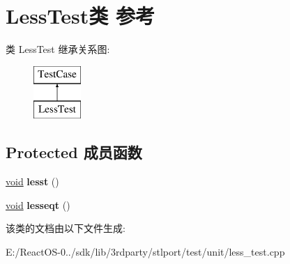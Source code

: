 \hypertarget{class_less_test}{}\section{Less\+Test类 参考}
\label{class_less_test}
类 Less\+Test 继承关系图\+:\begin{figure}[H]
\begin{center}
\leavevmode
\includegraphics[height=2.000000cm]{class_less_test}
\end{center}
\end{figure}
\subsection*{Protected 成员函数}
\begin{DoxyCompactItemize}
\item 
\mbox{\label{class_less_test_a00474b3009b950a2036be2594ff73301}} 
\hyperlink{interfacevoid}{void} {\bfseries lesst} ()
\item 
\mbox{\label{class_less_test_a5c8f87474570351a4429c7b8c67614a7}} 
\hyperlink{interfacevoid}{void} {\bfseries lesseqt} ()
\end{DoxyCompactItemize}


该类的文档由以下文件生成\+:\begin{DoxyCompactItemize}
\item 
E\+:/\+React\+O\+S-\/0../sdk/lib/3rdparty/stlport/test/unit/less\+\_\+test.\+cpp\end{DoxyCompactItemize}
